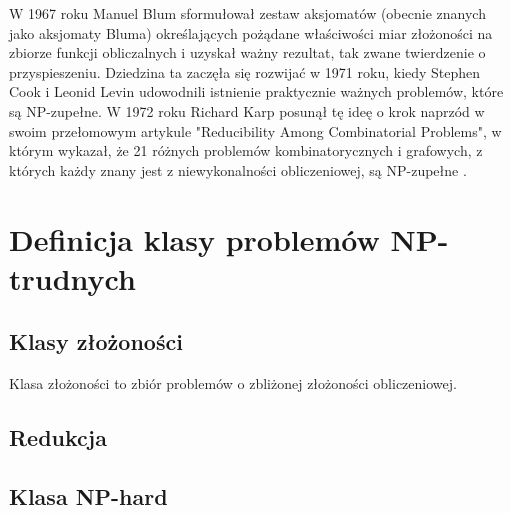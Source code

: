 W 1967 roku Manuel Blum sformułował zestaw aksjomatów (obecnie znanych jako aksjomaty Bluma) określających pożądane właściwości miar złożoności na zbiorze funkcji obliczalnych i uzyskał ważny rezultat, tak zwane twierdzenie o przyspieszeniu. Dziedzina ta zaczęła się rozwijać w 1971 roku, kiedy Stephen Cook i Leonid Levin udowodnili istnienie praktycznie ważnych problemów, które są NP-zupełne. W 1972 roku Richard Karp posunął tę ideę o krok naprzód w swoim przełomowym artykule "Reducibility Among Combinatorial Problems", w którym wykazał, że 21 różnych problemów kombinatorycznych i grafowych, z których każdy znany jest z niewykonalności obliczeniowej, są NP-zupełne \cite{Karp86}.

\section{Definicja klasy problemów NP-trudnych}

\subsection{Klasy złożoności}
Klasa złożoności to zbiór problemów o zbliżonej złożoności obliczeniowej. 

\subsection{Redukcja}

\subsection{Klasa NP-hard}

